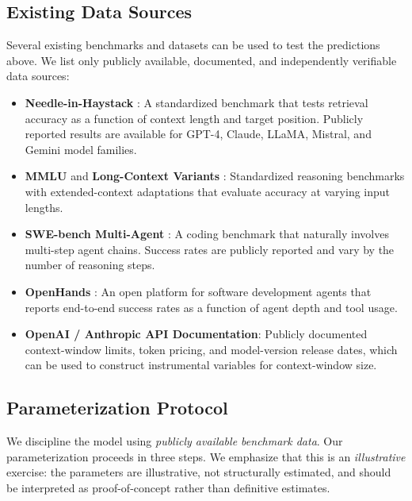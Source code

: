 \subsection{Existing Data Sources}
\label{subsec:data_sources}

Several existing benchmarks and datasets can be used to test the predictions above. We list only publicly available, documented, and independently verifiable data sources:

\begin{itemize}
\item \textbf{Needle-in-Haystack} \citep{kamradt2023needle}: A standardized benchmark that tests retrieval accuracy as a function of context length and target position. Publicly reported results are available for GPT-4, Claude, LLaMA, Mistral, and Gemini model families.
\item \textbf{MMLU} \citep{hendrycks2021measuring} and \textbf{Long-Context Variants} \citep{ Shaham2023}: Standardized reasoning benchmarks with extended-context adaptations that evaluate accuracy at varying input lengths.
\item \textbf{SWE-bench Multi-Agent} \citep{jimenez2024swe}: A coding benchmark that naturally involves multi-step agent chains. Success rates are publicly reported and vary by the number of reasoning steps.
\item \textbf{OpenHands} \citep{wang2024openhands}: An open platform for software development agents that reports end-to-end success rates as a function of agent depth and tool usage.
\item \textbf{OpenAI / Anthropic API Documentation}: Publicly documented context-window limits, token pricing, and model-version release dates, which can be used to construct instrumental variables for context-window size.
\end{itemize}

\subsection{Parameterization Protocol}
\label{subsec:calibration_protocol}

We discipline the model using \emph{publicly available benchmark data}. Our parameterization proceeds in three steps. We emphasize that this is an \emph{illustrative} exercise: the parameters are illustrative, not structurally estimated, and should be interpreted as proof-of-concept rather than definitive estimates.

